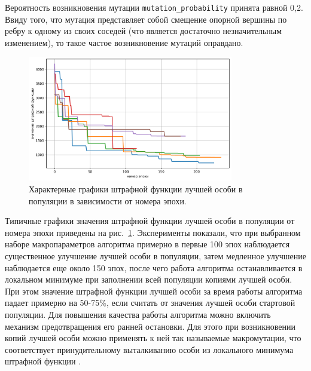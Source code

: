 Вероятность возникновения мутации \texttt{mutation\_probability} принята равной 0,2.
Ввиду того, что мутация представляет собой смещение опорной вершины по ребру к одному из своих соседей (что является достаточно незначительным изменением), то такое частое возникновение мутаций оправдано.

\begin{figure}[ht]
\centering
\includegraphics[width=0.8\textwidth]{./pics/text_2_genetic/chart1.png}
\singlespacing
{}\caption{Характерные графики штрафной функции лучшей особи в популяции в зависимости от номера эпохи.}
\label{fig:text_2_genetic_chart1}
\end{figure}

Типичные графики значения штрафной функции лучшей особи в популяции от номера эпохи приведены на рис.~\ref{fig:text_2_genetic_chart1}.
Эксперименты показали, что при выбранном наборе макропараметров алгоритма примерно в первые 100 эпох наблюдается существенное улучшение лучшей особи в популяции, затем медленное улучшение наблюдается еще около 150 эпох, после чего работа алгоритма останавливается в локальном минимуме при заполнении всей популяции копиями лучшей особи.
При этом значение штрафной функции лучшей особи за время работы алгоритма падает примерно на 50-75\%, если считать от значения лучшей особи стартовой популяции.
Для повышения качества работы алгоритма можно включить механизм предотвращения его ранней остановки.
Для этого при возникновении копий лучшей особи можно применять к ней так называемые макромутации, что соответствует принудительному выталкиванию особи из локального минимума штрафной функции \cite{Baranov2025Gen}.

